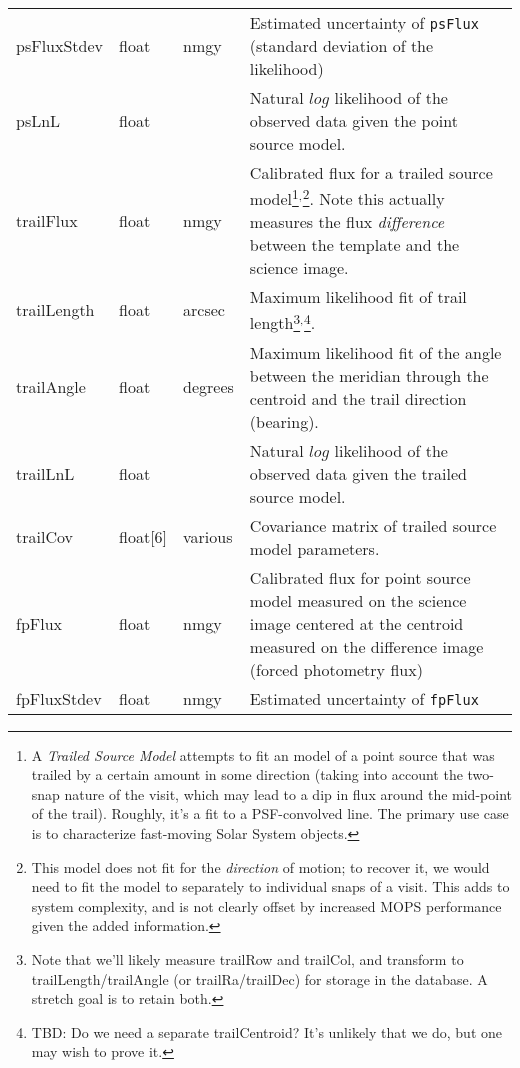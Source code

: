 \documentclass[12pt]{article}
\begin{document}
\begin{center}
\begin{longtable}{p{3cm}p{2cm}p{2cm}p{5cm}}
psFluxStdev & float & nmgy & Estimated uncertainty of \texttt{psFlux} (standard deviation of the likelihood) \\

psLnL & float & ~ & Natural $log$ likelihood of the observed data given the point source model. \\ 

trailFlux & float & nmgy & Calibrated flux for a trailed source model\footnote{A {\em Trailed Source Model} attempts to fit an model of a point source that was trailed by a certain amount in some direction (taking into account the two-snap nature of the visit, which may lead to a dip in flux around the mid-point of the trail). Roughly, it's a fit to a PSF-convolved line. The primary use case is to characterize fast-moving Solar System objects.}$^,$\footnote{This model does not fit for the {\em direction} of motion; to recover it, we would need to fit the model to separately to individual snaps of a visit. This adds to system complexity, and is not clearly offset by increased MOPS performance given the added information.}. Note this actually measures the flux {\em difference} between the template and the science image. \\ 

trailLength & float & arcsec & Maximum likelihood fit of trail length\footnote{Note that we'll likely measure trailRow and trailCol, and transform to trailLength/trailAngle (or trailRa/trailDec) for storage in the database. A stretch goal is to retain both.}$^,$\footnote{TBD: Do we need a separate trailCentroid? It's unlikely that we do, but one may wish to prove it.}. \\ 

trailAngle & float & degrees & Maximum likelihood fit of the angle between the meridian through the centroid and the trail direction (bearing). \\ 

trailLnL & float & ~ & Natural $log$ likelihood of the observed data given the trailed source model. \\ 

trailCov & float[6] & various & Covariance matrix of trailed source model parameters. \\ 

fpFlux & float & nmgy & Calibrated flux for point source model measured on the science image centered at the centroid measured on the difference image (forced photometry flux) \\ 

fpFluxStdev & float & nmgy & Estimated uncertainty of \texttt{fpFlux} \\ 


\end{longtable}
\end{center}
\end{document}
